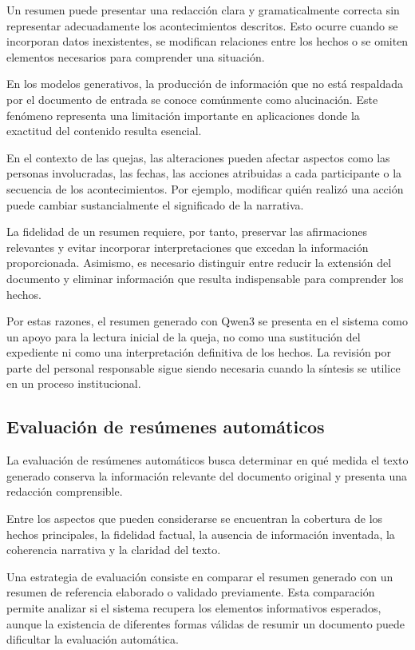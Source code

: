 Un resumen puede presentar una redacción clara y gramaticalmente correcta sin representar adecuadamente los acontecimientos descritos. Esto ocurre cuando se incorporan datos inexistentes, se modifican relaciones entre los hechos o se omiten elementos necesarios para comprender una situación.

En los modelos generativos, la producción de información que no está respaldada por el documento de entrada se conoce comúnmente como alucinación. Este fenómeno representa una limitación importante en aplicaciones donde la exactitud del contenido resulta esencial.

En el contexto de las quejas, las alteraciones pueden afectar aspectos como las personas involucradas, las fechas, las acciones atribuidas a cada participante o la secuencia de los acontecimientos. Por ejemplo, modificar quién realizó una acción puede cambiar sustancialmente el significado de la narrativa.

La fidelidad de un resumen requiere, por tanto, preservar las afirmaciones relevantes y evitar incorporar interpretaciones que excedan la información proporcionada. Asimismo, es necesario distinguir entre reducir la extensión del documento y eliminar información que resulta indispensable para comprender los hechos.

Por estas razones, el resumen generado con Qwen3 se presenta en el sistema como un apoyo para la lectura inicial de la queja, no como una sustitución del expediente ni como una interpretación definitiva de los hechos. La revisión por parte del personal responsable sigue siendo necesaria cuando la síntesis se utilice en un proceso institucional.

\subsection{Evaluación de resúmenes automáticos}

La evaluación de resúmenes automáticos busca determinar en qué medida el texto generado conserva la información relevante del documento original y presenta una redacción comprensible.

Entre los aspectos que pueden considerarse se encuentran la cobertura de los hechos principales, la fidelidad factual, la ausencia de información inventada, la coherencia narrativa y la claridad del texto.

Una estrategia de evaluación consiste en comparar el resumen generado con un resumen de referencia elaborado o validado previamente. Esta comparación permite analizar si el sistema recupera los elementos informativos esperados, aunque la existencia de diferentes formas válidas de resumir un documento puede dificultar la evaluación automática.

